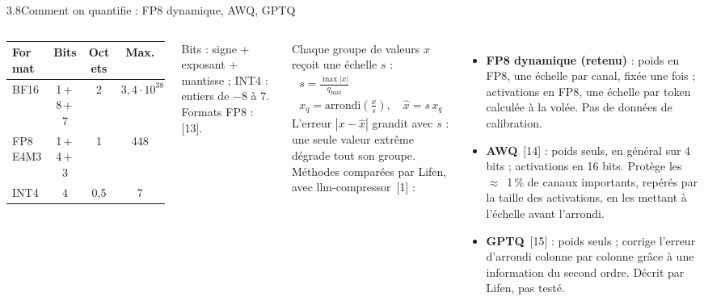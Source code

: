 \documentclass[11pt,aspectratio=169]{beamer}
\newcommand{\refs}[1]{{\color{mlblue}[#1]}}
\newcommand{\pct}[1]{#1\,\%}
\newcommand{\remarque}[1]{{\footnotesize\color{mlgray}#1\par}}
\begin{document}
\begin{frame}{3.8\quad Comment on quantifie : FP8 dynamique, AWQ, GPTQ}
  \begin{columns}[T]
    {\footnotesize
    \setlength{\tabcolsep}{4pt}
    \renewcommand{\arraystretch}{1.15}
    \begin{tabular}{@{}lccc@{}}
      \toprule
      Format & Bits & Octets & Max. \\
      \midrule
      BF16 & 1\,+\,8\,+\,7 & 2 & $3{,}4 \cdot 10^{38}$ \\
      FP8 E4M3 & 1\,+\,4\,+\,3 & 1 & 448 \\
      INT4 & 4 & 0,5 & 7 \\
      \bottomrule
    \end{tabular}}

    \remarque{Bits : signe + exposant + mantisse ; INT4 : entiers de $-8$ à 7. Formats
    FP8 : \refs{13}.}

    \medskip
    \small Chaque groupe de valeurs $x$ reçoit une échelle $s$ :
    \begin{gather*}
      s = \frac{\max |x|}{q_{\max}} \\
      x_q = \mathrm{arrondi}\!\left(\frac{x}{s}\right), \quad \hat x = s \, x_q
    \end{gather*}
    L'erreur $|x - \hat x|$ grandit avec $s$ : une seule valeur extrême dégrade tout son
    groupe.
    \small
    Méthodes comparées par Lifen, avec llm-compressor~\refs{1} :
    \begin{itemize}
      \item \textbf{FP8 dynamique (retenu)} : poids en FP8, une échelle par canal, fixée une
        fois ; activations en FP8, une échelle par token calculée à la volée. Pas de données
        de calibration.
      \item \textbf{AWQ}~\refs{14} : poids seuls, en général sur 4 bits ; activations en 16
        bits. Protège
        les~$\approx$~\pct{1} de canaux importants, repérés par la taille des activations, en
        les mettant à l'échelle avant l'arrondi.
      \item \textbf{GPTQ}~\refs{15} : poids seuls ; corrige l'erreur d'arrondi colonne par
        colonne grâce à une information du second ordre. Décrit par Lifen, pas testé.
    \end{itemize}
  \end{columns}
\end{frame}
\end{document}
